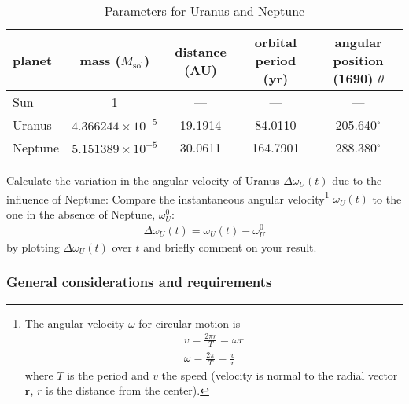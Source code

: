 \documentclass[letterpaper]{scrartcl}
\renewcommand{\vec}[1]{\ensuremath{\mathbf{#1}}}
\begin{document}
\begin{table}[bt]
  \centering
  \begin{tabular}{lcccc}
    \toprule
    planet & mass ($M_{\text{sol}}$) & distance (AU) 
           & orbital period (yr) & angular position (1690) $\theta$\\
    \midrule
    Sun    &      1 & --- & --- & ---\\
    Uranus & $4.366244\times 10^{-5}$ & 19.1914 & 84.0110 &
                                                            205.640$^{\circ}$\\
    Neptune & $5.151389\times 10^{-5}$ & 30.0611 & 164.7901 & 
                                                              288.380$^{\circ}$\\
    \bottomrule
  \end{tabular}
  \caption{Parameters for Uranus and Neptune}
  \label{tab:parameters}
\end{table}

Calculate the variation in the angular velocity of Uranus
$\Delta\omega_U(t)$ due to the influence of Neptune: Compare the
instantaneous angular velocity\footnote{The angular velocity $\omega$
  for circular motion is
  \begin{gather*}
    v = \frac{2\pi r}{T} = \omega r\\
    \omega = \frac{2\pi}{T} = \frac{v}{r}
  \end{gather*}
  where $T$ is the period and $v$ the speed (velocity is normal to the
  radial vector $\vec{r}$, $r$ is the distance from the center).}
$\omega_U(t)$ to the one in the absence of Neptune, $\omega^0_U$:
\begin{gather}
  \Delta\omega_U(t) = \omega_U(t) - \omega^0_U\label{eq:DeltaOmega}
\end{gather}
by plotting $\Delta\omega_U(t)$ over $t$ and briefly comment on your
result.

\subsubsection{General considerations and requirements}
\label{sec:general}
\end{document}
